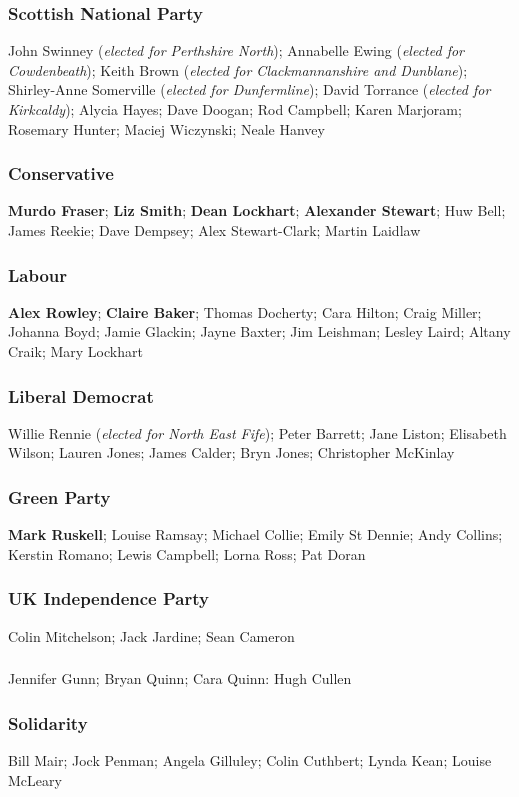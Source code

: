 \begin{resultsiii}
\subsubsection*{Scottish National Party}
John Swinney (\emph{elected for Perthshire North}); Annabelle Ewing (\emph{elected for Cowdenbeath}); Keith Brown (\emph{elected for Clackmannanshire and Dunblane}); Shirley-Anne Somerville (\emph{elected for Dunfermline}); David Torrance (\emph{elected for Kirkcaldy}); Alycia Hayes; Dave Doogan; Rod Campbell; Karen Marjoram; Rosemary Hunter; Maciej Wiczynski; Neale Hanvey
\subsubsection*{Conservative}
\textbf{Murdo Fraser}; \textbf{Liz Smith}; \textbf{Dean Lockhart}; \textbf{Alexander Stewart}; Huw Bell; James Reekie; Dave Dempsey; Alex Stewart-Clark; Martin Laidlaw
\subsubsection*{Labour}
\textbf{Alex Rowley}; \textbf{Claire Baker}; Thomas Docherty; Cara Hilton; Craig Miller; Johanna Boyd; Jamie Glackin; Jayne Baxter; Jim Leishman; Lesley Laird; Altany Craik; Mary Lockhart
\subsubsection*{Liberal Democrat}
Willie Rennie (\emph{elected for North East Fife}); Peter Barrett; Jane Liston; Elisabeth Wilson; Lauren Jones; James Calder; Bryn Jones; Christopher McKinlay
\subsubsection*{Green Party}
\textbf{Mark Ruskell}; Louise Ramsay; Michael Collie; Emily St Dennie; Andy Collins; Kerstin Romano; Lewis Campbell; Lorna Ross; Pat Doran
\subsubsection*{UK Independence Party}
Colin Mitchelson; Jack Jardine; Sean Cameron
\subsubsection*{\RISE}
Jennifer Gunn; Bryan Quinn; Cara Quinn: Hugh Cullen
\subsubsection*{Solidarity}
Bill Mair; Jock Penman; Angela Gilluley; Colin Cuthbert; Lynda Kean; Louise McLeary
\end{resultsiii}

